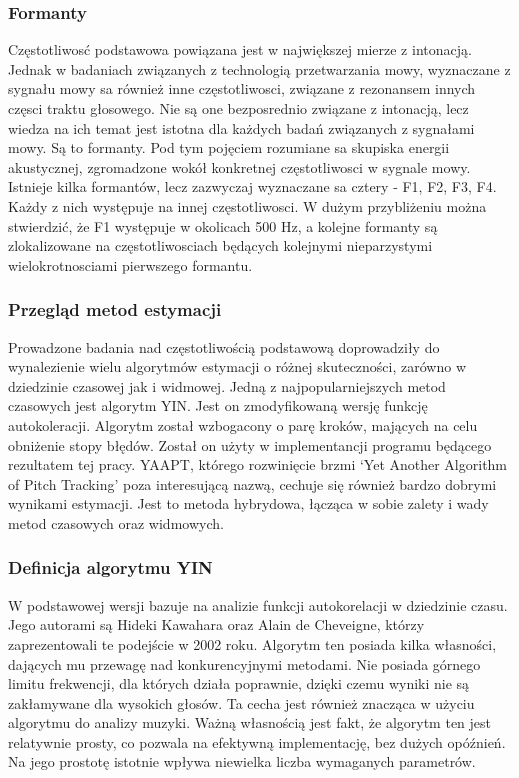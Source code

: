 \documentclass[a4paper,12 pt]{article}
\begin{document}
\subsubsection{Formanty}
Częstotliwosć podstawowa powiązana jest w największej mierze z intonacją. Jednak w badaniach związanych z technologią przetwarzania mowy, wyznaczane z sygnału mowy sa również inne częstotliwosci, związane z rezonansem innych częsci traktu głosowego. Nie są one bezposrednio związane z intonacją, lecz wiedza na ich temat jest istotna dla każdych badań związanych z sygnałami mowy. Są to formanty. Pod tym pojęciem rozumiane sa skupiska energii akustycznej, zgromadzone wokół konkretnej częstotliwosci w sygnale mowy. Istnieje kilka formantów, lecz zazwyczaj wyznaczane sa cztery - F1, F2, F3, F4. Każdy z nich występuje na innej częstotliwosci. W dużym przybliżeniu można stwierdzić, że F1 występuje w okolicach 500 Hz, a kolejne formanty są zlokalizowane na częstotliwosciach będących kolejnymi nieparzystymi wielokrotnosciami pierwszego formantu.
\subsubsection{Przegląd metod estymacji}
Prowadzone badania nad częstotliwością podstawową doprowadziły do wynalezienie wielu algorytmów estymacji o różnej skuteczności, zarówno w dziedzinie czasowej jak i widmowej.
Jedną z najpopularniejszych metod czasowych jest algorytm YIN. Jest on zmodyfikowaną wersję funkcję autokoleracji. Algorytm został wzbogacony o parę kroków, mających na celu obniżenie stopy błędów. Został on użyty w implementancji programu będącego rezultatem tej pracy.
YAAPT, którego rozwinięcie brzmi `Yet Another Algorithm of Pitch Tracking' poza interesującą nazwą, cechuje się również bardzo dobrymi wynikami estymacji. Jest to metoda hybrydowa, łącząca w sobie zalety i wady metod czasowych oraz widmowych.
 
 




\subsubsection{Definicja algorytmu YIN}

W podstawowej wersji bazuje na analizie funkcji autokorelacji w dziedzinie czasu. Jego autorami są Hideki Kawahara oraz Alain de Cheveigne, którzy zaprezentowali te podejście w 2002 roku. Algorytm ten posiada kilka własności, dających mu przewagę nad konkurencyjnymi metodami. Nie posiada górnego limitu frekwencji, dla których działa poprawnie, dzięki czemu wyniki nie są zakłamywane dla wysokich głosów. Ta cecha jest również znacząca w użyciu algorytmu do analizy muzyki. Ważną własnością jest fakt, że algorytm ten jest relatywnie prosty, co pozwala na efektywną implementację, bez dużych opóźnień. Na jego prostotę istotnie wpływa niewielka liczba wymaganych parametrów.
\end{document}
